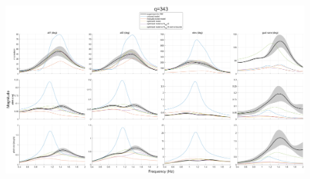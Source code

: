 \begin{landscape}
\begin{figure}[H]
    \centering
    \includegraphics[width=9in]{figs/optFRFplot/FRFCOMPARE_MODEL_COMPARISON_q343.png} 
    \label{fig:optFRFplot_q343}
\end{figure}


\end{landscape}